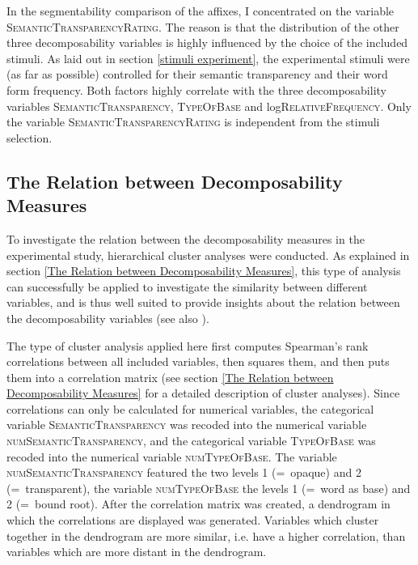 In the segmentability comparison of the affixes, I concentrated on the variable \textsc{SemanticTransparencyRating}. The reason is that the distribution of the other three decomposability variables is highly influenced by the choice of the included stimuli. 
 As laid out in section \ref{stimuli experiment}, the experimental stimuli were (as far as possible) controlled for their semantic transparency  and their word form frequency. Both factors highly correlate with the three decomposability variables  \textsc{SemanticTransparency}, \textsc{TypeOfBase} and log\textsc{RelativeFrequency}. 
 Only the variable \textsc{SemanticTransparencyRating} is independent from the stimuli selection.



\subsection{The Relation between Decomposability Measures}

To investigate the relation between the decomposability measures in the experimental study, hierarchical cluster analyses were conducted. As  explained in section \ref{The Relation between Decomposability Measures}, this type of analysis can successfully be applied to investigate the similarity between different variables, and is thus well suited to provide insights about the relation between the decomposability variables (see also \citealt[200 f.]{Baayen.2008}). 

The type of cluster analysis applied here first computes Spearman's rank correlations between all included variables, then squares them, and then puts them into a correlation matrix  (see section \ref{The Relation between Decomposability Measures} for a detailed description of cluster analyses). 
Since correlations can only be calculated for numerical variables, 
the categorical variable \textsc{SemanticTransparency}  was recoded into the numerical variable \textsc{numSemanticTransparency}, and the categorical variable \textsc{TypeOfBase} was recoded into the numerical variable \textsc{numTypeOfBase}.  The variable \textsc{numSemanticTransparency} featured  the two levels 1 (=~opaque) and 2 (=~transparent), the variable \textsc{numTypeOfBase} the levels 1 (=~word as base) and 2 (=~bound root). After the correlation matrix was created,  a dendrogram in which the correlations are displayed was generated. Variables which cluster together in the dendrogram are more similar, i.e. have a higher correlation, than variables which are more distant in the dendrogram. 



